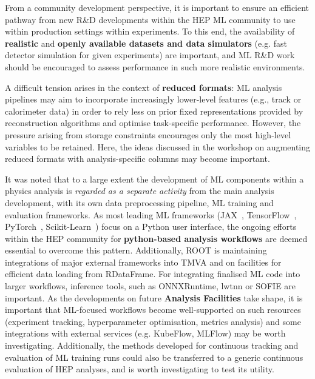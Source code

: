\documentclass[a4paper,11pt]{article}
\begin{document}
From a community development perspective, it is important to ensure an
efficient pathway from new R\&D developments within the HEP ML community
to use within production settings within experiments. To this end, the
availability of \textbf{realistic} and \textbf{openly available datasets
and data simulators} (e.g. fast detector simulation for given
experiments) are important, and ML R\&D work should be encouraged to
assess performance in such more realistic environments.

A difficult tension arises in the context of \textbf{reduced formats}:
ML analysis pipelines may aim to incorporate increasingly lower-level
features (e.g., track or calorimeter data) in order to rely less on prior
fixed representations provided by reconstruction algorithms and optimise
task-specific performance. However, the pressure arising from storage
constraints encourages only the most high-level variables to be
retained. Here, the ideas discussed in the workshop on augmenting
reduced formats with analysis-specific columns may become important.

It was noted that to a large extent the development of ML components
within a physics analysis is \emph{regarded as a separate activity} from
the main analysis development, with its own data preprocessing pipeline,
ML training and evaluation frameworks. As most leading ML frameworks
(JAX~\cite{jax2018github}, TensorFlow~\cite{tensorflow2015-whitepaper}, PyTorch~\cite{NEURIPS2019_9015}, Scikit-Learn~\cite{scikit-learn}) focus on a Python user
interface, the ongoing efforts within the HEP community for
\textbf{python-based analysis workflows} are deemed essential to
overcome this pattern. Additionally, ROOT is maintaining integrations of
major external frameworks into TMVA and on facilities for efficient data
loading from RDataFrame. For integrating finalised ML code into larger
workflows, inference tools, such as ONNXRuntime, lwtnn or SOFIE are
important. As the developments on future \textbf{Analysis Facilities}
take shape, it is important that ML-focused workflows become
well-supported on such resources (experiment tracking, hyperparameter
optimisation, metrics analysis) and some integrations with external
services (e.g. KubeFlow, MLFlow) may be worth investigating.
Additionally, the methods developed for continuous tracking and
evaluation of ML training runs could also be transferred to a generic
continuous evaluation of HEP analyses, and is worth investigating to
test its utility.
\end{document}
